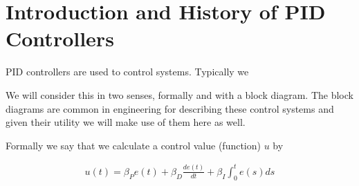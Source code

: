 \documentclass{unswmaths}
\begin{document}
\section*{Introduction and History of PID Controllers}

PID controllers are used to control systems. Typically we 
%
%


We will consider this in two senses, formally and with a block diagram. The block diagrams are common in engineering for describing these control systems and given their
utility we will make use of them here as well.

Formally we say that we calculate a control value (function) $ u $ by

\begin{align*}
	u(t) = \beta_{P} e(t) + \beta_{D}\frac{de(t)}{dt} + \beta_{I} \int_{0}^{t} e(s) ds
\end{align*}




\end{document}

